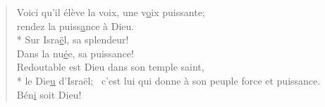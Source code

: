 \begin{verse}
Voici qu’il élève la voix, une v\underline{o}ix puissante; \\
rendez la puiss\underline{a}nce à Dieu. \\*
Sur Isra\underline{ë}l, sa splendeur! \\
Dans la nu\underline{é}e, sa puissance! \\

Redoutable est Dieu dans son temple saint, \\*
le Die\underline{u} d’Israël;~\psalmstar
c’est lui qui donne à son peuple
force et puissance. \\
Bén\underline{i} soit Dieu! \\
\end{verse}

